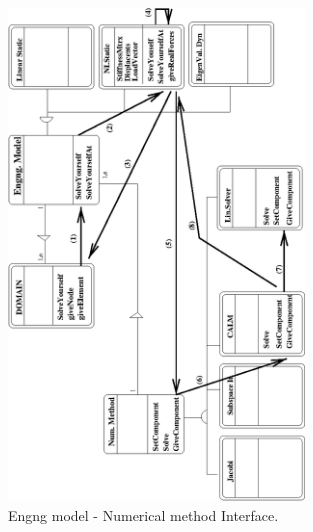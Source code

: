 \documentclass[a4paper]{article}
\begin{document}
\begin{figure}[tb]
\else
\centerline{\includegraphics[width=0.7\textwidth]{struct2.eps}}
\fi
\caption{Engng model - Numerical method Interface.}
\label{engngNummet1fig}
\end{figure}
\end{document}
